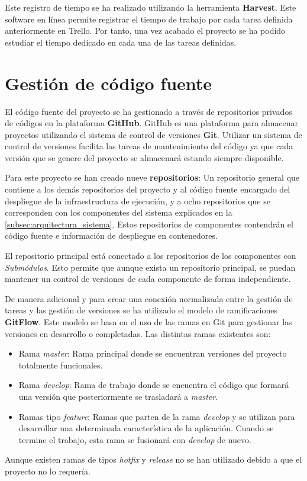 \documentclass[../main.tex]{subfiles}
\begin{document}
Este registro de tiempo se ha realizado utilizando la herramienta \textbf{Harvest}\cite{harvest}. Este software en línea permite registrar el tiempo de trabajo por cada tarea definida anteriormente en Trello. Por tanto, una vez acabado el proyecto se ha podido estudiar el tiempo dedicado en cada una de las tareas definidas.

\section{Gestión de código fuente}
El código fuente del proyecto se ha gestionado a través de repositorios privados de códigos en la plataforma \textbf{GitHub}\cite{github}. GitHub es una plataforma para almacenar proyectos utilizando el sistema de control de versiones \textbf{Git}\cite{Somasundaram2013}. Utilizar un sistema de control de versiones facilita las tareas de mantenimiento del código ya que cada versión que se genere del proyecto se almacenará estando siempre disponible.

Para este proyecto se han creado nueve \textbf{repositorios}: Un repositorio general que contiene a los demás repositorios del proyecto y al código fuente encargado del despliegue de la infraestructura de ejecución, y a ocho repositorios que se corresponden con los componentes del sistema explicados en la \autoref{subsec:arquitectura_sistema}. Estos repositorios de componentes contendrán el código fuente e información de despliegue en contenedores.

El repositorio principal está conectado a los repositorios de los componentes con \textit{Submódulos}. Esto permite que aunque exista un repositorio principal, se puedan mantener un control de versiones de cada componente de forma independiente.

De manera adicional y para crear una conexión normalizada entre la gestión de tareas y las gestión de versiones se ha utilizado el modelo de ramificaciones \textbf{GitFlow}. Este modelo se basa en el uso de las ramas en Git para gestionar las versiones en desarrollo o completadas. Las distintas ramas existentes son:
\begin{itemize}
    \item Rama \textit{master}: Rama principal donde se encuentran versiones del proyecto totalmente funcionales.
    \item Rama \textit{develop}: Rama de trabajo donde se encuentra el código que formará una versión que posteriormente se trasladará a \textit{master}.
    \item Ramas tipo \textit{feature}: Ramas que parten de la rama \textit{develop} y se utilizan para desarrollar una determinada característica de la aplicación. Cuando se termine el trabajo, esta rama se fusionará con \textit{develop} de nuevo. 
\end{itemize}
Aunque existen ramas de tipos \textit{hotfix} y \textit{release} no se han utilizado debido a que el proyecto no lo requería.
\end{document}

